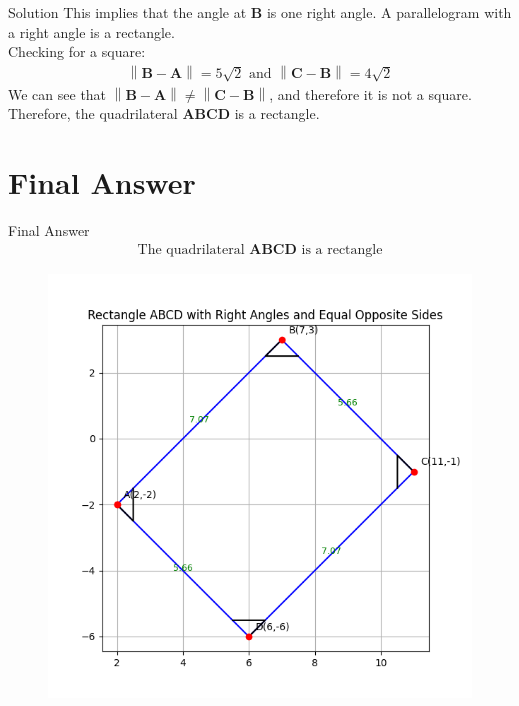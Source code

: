 \documentclass{beamer}
\let\vec\mathbf
\theoremstyle{remark}
\providecommand{\norm}[1]{\left\lVert#1\right\rVert}
\begin{document}
\begin{frame}{Solution}
This implies that the angle at $\vec{B}$ is one right angle. A parallelogram with a right angle is a rectangle.\\
Checking for a square:
\begin{align}
    \norm{\vec{B}- \vec{A}}=5\sqrt{2} \text{ and } \norm{\vec{C}- \vec{B}}=4\sqrt{2} 
\end{align}
We can see that $\norm{\vec{B}-\vec{A}} \neq \norm{\vec{C}-\vec{B}}$, and therefore it is not a square.\\
Therefore, the quadrilateral $\vec{A}\vec{B}\vec{C}\vec{D}$ is a rectangle.
    
\end{frame}


\section{Final Answer}
\begin{frame}{Final Answer}
\begin{align}
    \text{The quadrilateral $\vec{A}\vec{B}\vec{C}\vec{D}$ is a rectangle}
\end{align}
\begin{figure}
    \centering
    \includegraphics[width=0.5\columnwidth]{figs/1.png}
\end{figure}
\end{frame}
\end{document}
